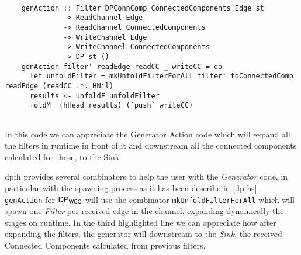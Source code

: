 \begin{listing}[H]
  \begin{verbatim}
    
    genAction :: Filter DPConnComp ConnectedComponents Edge st
              -> ReadChannel Edge
              -> ReadChannel ConnectedComponents
              -> WriteChannel Edge
              -> WriteChannel ConnectedComponents
              -> DP st ()
    genAction filter' readEdge readCC _ writeCC = do
      let unfoldFilter = mkUnfoldFilterForAll filter' toConnectedComp readEdge (readCC .*. HNil) 
      results <- unfoldF unfoldFilter
      foldM_ (hHead results) (`push` writeCC)
        
  \end{verbatim}
  \caption[{[\texttt{ConnectedComp.hs}] Generator Action Code}]{In this code we can appreciate the Generator Action code which will expand all the filters in runtime in front of it and downstream all the connected components calculated for those, to the Sink}
  \label{src:dpwcc:3}
\end{listing}

\acrshort{dpfh} provides several combinators to help the user with the \textit{Generator} code, in particular with the spawning process as it has been describe in \autoref{dp-hs}.
\texttt{genAction} for $\mathsf{DP_{WCC}}$ will use the combinator \texttt{mkUnfoldFilterForAll} which will spawn one \textit{Filter} per received edge in the channel, expanding dynamically the stages on runtime.
In the third highlighted line we can appreciate how after expanding the filters, the generator will downstream to the \textit{Sink}, the received Connected Components calculated from previous filters.

